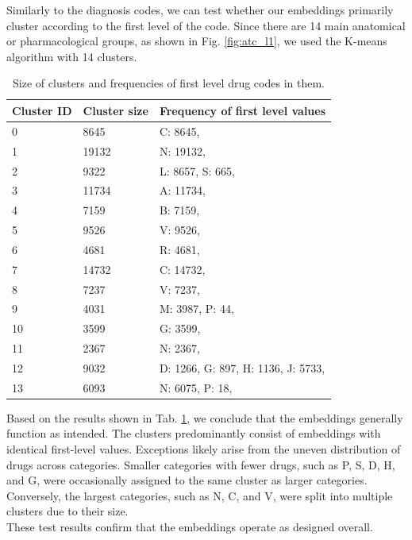 Similarly to the diagnosis codes, we can test whether our embeddings primarily cluster according to the first level of the code. Since there are 14 main anatomical or pharmacological groups, as shown in Fig. \ref{fig:atc_l1}, we used the K-means algorithm with 14 clusters.
\\

\begin{table}[!h]
	\centering
	\begin{tabular}{|p{}|p{}|p{}|}
		\hline
		Cluster ID & Cluster size & Frequency of first level values \\ \hline
		0 & 8645 & C: 8645, \\ \hline
		1 & 19132 & N: 19132, \\ \hline
		2 & 9322 & L: 8657, S: 665, \\ \hline
		3 & 11734 & A: 11734, \\ \hline
		4 & 7159 & B: 7159, \\ \hline
		5 & 9526 & V: 9526, \\ \hline
		6 & 4681 & R: 4681, \\ \hline
		7 & 14732 & C: 14732, \\ \hline
		8 & 7237 & V: 7237, \\ \hline
		9 & 4031 & M: 3987, P: 44, \\ \hline
		10 & 3599 & G: 3599, \\ \hline
		11 & 2367 & N: 2367, \\ \hline
		12 & 9032 & D: 1266, G: 897, H: 1136, J: 5733, \\ \hline
		13 & 6093 & N: 6075, P: 18, \\ \hline
	\end{tabular}
\caption{Size of clusters and frequencies of first level drug codes in them.}
\label{tab:drug_clusters}
\end{table}

Based on the results shown in Tab. \ref{tab:drug_clusters}, we conclude that the embeddings generally function as intended. The clusters predominantly consist of embeddings with identical first-level values. Exceptions likely arise from the uneven distribution of drugs across categories. Smaller categories with fewer drugs, such as P, S, D, H, and G, were occasionally assigned to the same cluster as larger categories. Conversely, the largest categories, such as N, C, and V, were split into multiple clusters due to their size. 
\\

These test results confirm that the embeddings operate as designed overall.

